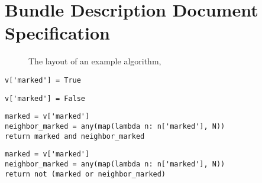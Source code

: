 \section{Bundle Description Document Specification}
\label{sec:bundle-descr-docum}

\begin{figure}[p]
  \centering
  \small
  \begin{minipage}{.4\textwidth}
  \end{minipage}
  \caption{The layout of an example algorithm, }
  \label{fig:interop:ssax-structure}
\end{figure}
\begin{lstlisting}[float=p,caption={\directory{moves/mark.py}},label={lst:ex:mark}]
v['marked'] = True
\end{lstlisting}
\begin{lstlisting}[float=p,caption={\directory{moves/unmark.py}},label={lst:ex:unmark}]
v['marked'] = False
\end{lstlisting}
\begin{lstlisting}[float=p,caption={\directory{predicates/marked-and-neighbor-marked.py}},label={lst:ex:should-unmark}]
marked = v['marked']
neighbor_marked = any(map(lambda n: n['marked'], N))
return marked and neighbor_marked
\end{lstlisting}
\begin{lstlisting}[float=p,caption={\directory{predicates/unmarked-and-neighbors-unmarked.py}},label={lst:ex:should-mark}]
marked = v['marked']
neighbor_marked = any(map(lambda n: n['marked'], N))
return not (marked or neighbor_marked)
\end{lstlisting}
